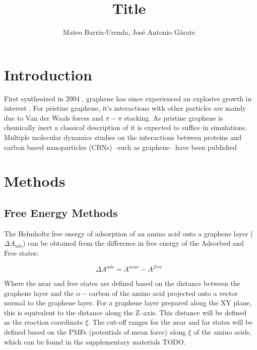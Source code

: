 \documentclass[twoside,twocolumn,9pt]{article}
\author{Mateo Barria-Urenda, José Antonio Gárate}
\title{Title}
\date{}
\begin{document}
\maketitle

\abstract{}

\section{Introduction}


First synthesized in 2004 \cite{Novoselov_2004}, graphene has since
experienced an explosive growth in interest \cite{Randviir_2014}.  For
pristine graphene, it's interactions with other particles are mainly
due to Van der Waals forces and $\pi-\pi$ stacking. \cite{Zuo_2012} As
pristine graphene is chemically inert \cite{Eftekhari_2017} a
classical description of it is expected to suffice in simulations.
Multiple molecular dynamics studies on the interactions between
proteins and carbon based nanoparticles (CBNs) --such as graphene--
have been published \cite{Zheng_2003, Ge_2011, Zuo_2012, Chong_2015,
  Duan_2015, Shityakov_2015, Al_Qattan_2018,Puigpelat_2019,
  Gonz_lez_Durruthy_2020, Li_2020}





\section{Methods}

\subsection{Free Energy Methods}

The Helmholtz free energy of adsorption of an amino acid onto a
graphene layer ($\Delta A_{ads}$) can be obtained from the difference
in free energy of the Adsorbed and Free states:

\begin{equation}
\label{eq:Adsorption}
\Delta A^{ads} = A^{near} - A^{free}
\end{equation}

Where the near and free states are defined based on the
distance between the graphene layer and the $\alpha-$carbon of the
amino acid projected onto a vector normal to the graphene layer. For a
graphene layer prepared along the XY plane, this is equivalent to the
distance along the Z--axis. This distance will be defined as the
reaction coordinate $\xi$. The cut-off ranges for the near and far
states will be defined based on the PMFs (potentials of mean force)
along $\xi$ of the amino acids, which can be found in the
supplementary materials TODO.
\end{document}
